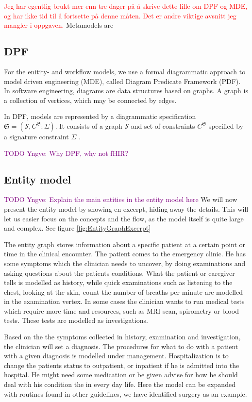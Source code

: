 \textcolor{red}{Jeg har egentlig brukt mer enn tre dager på å skrive dette lille om DPF og MDE, og har ikke tid til å fortsette på denne måten. Det er andre viktige avsnitt jeg mangler i oppgaven.}
Metamodels are 

\subsection{DPF}
For the enitity- and workflow models, we use a formal diagrammatic approach to model driven engineering (MDE), called Diagram Predicate Framework (PDF). In software engineering, diagrams are data structures based on graphs. A graph is a collection of vertices, which may be connected by edges.

In DPF, models are represented by a diagrammatic specification \(\mathfrak{S} = ({\mathcal{S}}, C^{\mathfrak{S}} : \Sigma)\). It consists of a graph \(\mathcal{S}\) and set of constraints \(C^{\mathfrak{S}}\) specified by a signature constraint $\Sigma$ \parencite{Rutle2010}. 


\textcolor{purple}{TODO Yngve: Why DPF, why not fHIR?}
\subsection{Entity model}
\textcolor{purple}{TODO Yngve: Explain the main entities in the entity model here}
We will now present the entity model by showing en excerpt, hiding away the details. This will let us easier focus on the concepts and the flow, as the model itself is quite large and complex. See figure \ref{fig:EntityGraphExcerpt}

The entity graph stores information about a specific patient at a certain point or time in the clinical encounter. The patient comes to the emergency clinic. He has some symptoms which the clinician needs to uncover, by doing examinations and asking questions about the patients conditions. What the patient or caregiver tells is modelled as history, while quick examinations such as listening to the chest, looking at the skin, count the number of breaths per minute are modelled in the examination vertex. In some cases the clinician wants to run medical tests which require more time and resources, such as MRI scan, spirometry or blood tests. These tests are modelled as investigations.

Based on the the symptoms collected in history, examination and investigation, the clinician will set a diagnosis. The procedures for what to do with a patient with a given diagnosis is modelled under management. Hospitalization is to change the patients status to outpatient, or inpatient if he is admitted into the hospital. He might need some medication or be given advise for how he should deal with his condition the in every day life. Here the model can be expanded with routines found in other guidelines, we have identified surgery as an example. 

